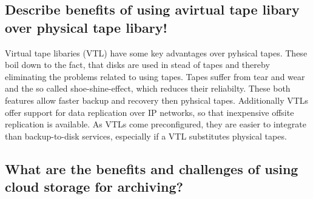 \subsection{Describe benefits of using avirtual tape libary over physical tape libary!} %
\label{sub:describe_benefits_of_using_avirtual_tape_libary_over_physical_tape_libary}
	Virtual tape libaries (VTL) have some key advantages over pyhsical tapes.
	These boil down to the fact,
	that disks are used in stead of tapes
	and thereby eliminating the problems related to using tapes.
	Tapes suffer from tear and wear and the so called shoe-shine-effect,
	which reduces their reliabilty.
	These both features allow faster backup and recovery
	then pyhsical tapes.
	Additionally VTLs offer support for data replication over IP networks,
	so that inexpensive offsite replication is available.
	As VTLs come preconfigured,
	they are easier to integrate than backup-to-disk services,
	especially if a VTL substitutes physical tapes.

\subsection{What are the benefits and challenges of using cloud storage for archiving?} %
\label{sub:what_are_the_benefits_and_challenges_of_using_cloud_storage_for_archiving}


